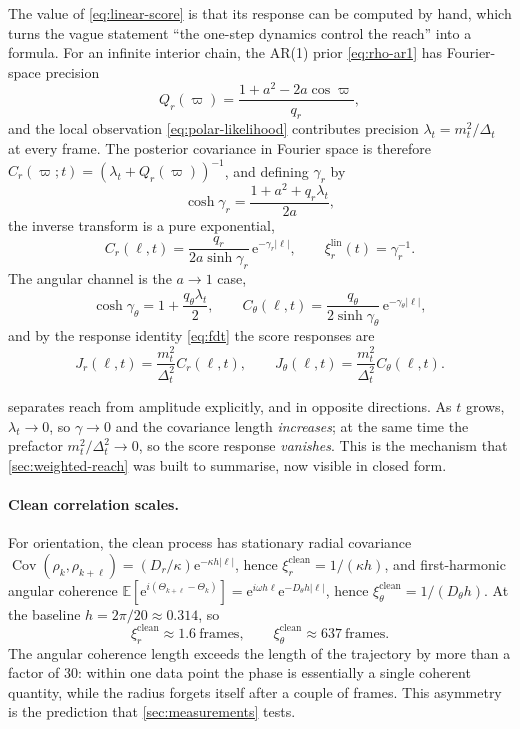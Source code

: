 \documentclass[11pt,a4paper]{article}
\newcommand{\E}{\mathbb{E}}
\newcommand{\mt}{m_t}
\newcommand{\Dt}{\Delta_t}
\newcommand{\Cov}{\operatorname{Cov}}
\newcommand{\e}{\mathrm e}
\newcommand{\ohat}{\widehat}
\begin{document}
The value of \eqref{eq:linear-score} is that its response can be computed by hand, which turns
the vague statement ``the one-step dynamics control the reach'' into a formula. For an
infinite interior chain, the AR(1) prior \eqref{eq:rho-ar1} has Fourier-space precision
\begin{equation}
 Q_r(\varpi)=\frac{1+a^2-2a\cos\varpi}{q_r} ,
\end{equation}
and the local observation \eqref{eq:polar-likelihood} contributes precision
$\lambda_t=\mt^2/\Dt$ at every frame. The posterior covariance in Fourier space is therefore
$\ohat C_r(\varpi;t)=(\lambda_t+Q_r(\varpi))^{-1}$, and defining $\gamma_r$ by
\begin{equation}
 \cosh\gamma_r=\frac{1+a^2+q_r\lambda_t}{2a} ,
 \label{eq:gamma-r}
\end{equation}
the inverse transform is a pure exponential,
\begin{equation}
 C_r(\ell,t)=\frac{q_r}{2a\sinh\gamma_r}\,\e^{-\gamma_r|\ell|},
 \qquad \xi_r^{\mathrm{lin}}(t)=\gamma_r^{-1} .
 \label{eq:linear-radial-cov}
\end{equation}
The angular channel is the $a\to1$ case,
\begin{equation}
 \cosh\gamma_\theta=1+\frac{q_\theta\lambda_t}{2},
 \qquad
 C_\theta(\ell,t)=\frac{q_\theta}{2\sinh\gamma_\theta}\,\e^{-\gamma_\theta|\ell|} ,
 \label{eq:linear-angular-cov}
\end{equation}
and by the response identity \eqref{eq:fdt} the score responses are
\begin{equation}
 J_r(\ell,t)=\frac{\mt^2}{\Dt^2}C_r(\ell,t),
 \qquad
 J_\theta(\ell,t)=\frac{\mt^2}{\Dt^2}C_\theta(\ell,t) .
 \label{eq:linear-response}
\end{equation}

 separates reach from amplitude explicitly, and in opposite
directions. As $t$ grows, $\lambda_t\to0$, so $\gamma\to0$ and the covariance length
\emph{increases}; at the same time the prefactor $\mt^2/\Dt^2\to0$, so the score response
\emph{vanishes}. This is the mechanism that \cref{sec:weighted-reach} was built to summarise,
now visible in closed form.

\paragraph{Clean correlation scales.} For orientation, the clean process has stationary radial
covariance $\Cov(\rho_k,\rho_{k+\ell})=(D_r/\kappa)\e^{-\kappa h|\ell|}$, hence
$\xi_r^{\mathrm{clean}}=1/(\kappa h)$, and first-harmonic angular coherence
$\E[\e^{i(\Theta_{k+\ell}-\Theta_k)}]=\e^{i\omega h\ell}\e^{-D_\theta h|\ell|}$, hence
$\xi_\theta^{\mathrm{clean}}=1/(D_\theta h)$. At the baseline $h=2\pi/20\approx0.314$, so
\[
 \xi_r^{\mathrm{clean}}\approx1.6\ \text{frames},
 \qquad
 \xi_\theta^{\mathrm{clean}}\approx637\ \text{frames} .
\]
The angular coherence length exceeds the length of the trajectory by more than a factor of $30$: within
one data point the phase is essentially a single coherent quantity, while the radius forgets
itself after a couple of frames. This asymmetry is the prediction that
\cref{sec:measurements} tests.
\end{document}

